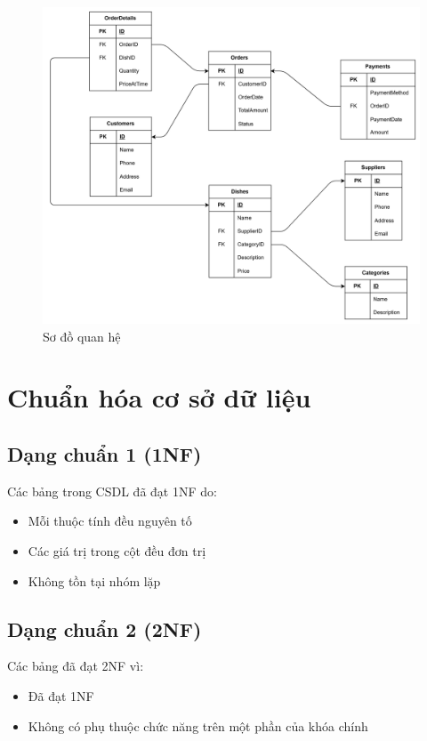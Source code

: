 \documentclass{article}
\begin{document}
\begin{figure}[H]
    \centering
    \includegraphics[width=\textwidth]{RelationshipDiagram.png}
    \caption{Sơ đồ quan hệ}
\end{figure}

\section{Chuẩn hóa cơ sở dữ liệu}

\subsection{Dạng chuẩn 1 (1NF)}

Các bảng trong CSDL đã đạt 1NF do:

\begin{itemize}
    \item Mỗi thuộc tính đều nguyên tố
    \item Các giá trị trong cột đều đơn trị
    \item Không tồn tại nhóm lặp
\end{itemize}

\subsection{Dạng chuẩn 2 (2NF)}

Các bảng đã đạt 2NF vì:

\begin{itemize}
    \item Đã đạt 1NF
    \item Không có phụ thuộc chức năng trên một phần của khóa chính
\end{itemize}
\end{document}
